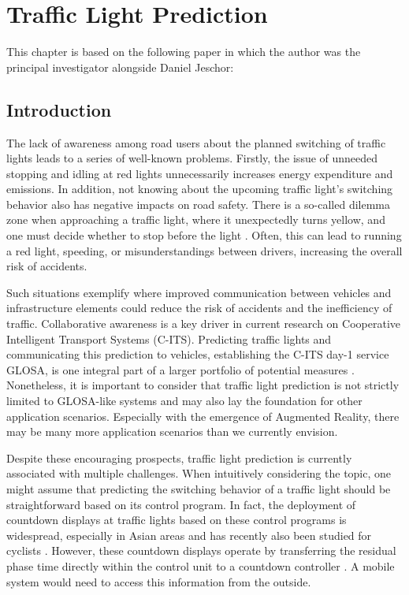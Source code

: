 \chapter{Traffic Light Prediction}\label{ch:prediction}

\begin{Summary}
This chapter is based on the following paper in which the author was the principal investigator alongside Daniel Jeschor:

\cite{jeschor2024cloudy} 
\end{Summary}

\section{Introduction}

The lack of awareness among road users about the planned switching of traffic lights leads to a series of well-known problems. Firstly, the issue of unneeded stopping and idling at red lights unnecessarily increases energy expenditure and emissions. In addition, not knowing about the upcoming traffic light's switching behavior also has negative impacts on road safety. There is a so-called dilemma zone when approaching a traffic light, where it unexpectedly turns yellow, and one must decide whether to stop before the light \cite{zhang_yellow_2014}. Often, this can lead to running a red light, speeding, or misunderstandings between drivers, increasing the overall risk of accidents.

Such situations exemplify where improved communication between vehicles and infrastructure elements could reduce the risk of accidents and the inefficiency of traffic. Collaborative awareness is a key driver in current research on Cooperative Intelligent Transport Systems (C-ITS). Predicting traffic lights and communicating this prediction to vehicles, establishing the C-ITS day-1 service GLOSA, is one integral part of a larger portfolio of potential measures \cite{mellegard_day_2020}. Nonetheless, it is important to consider that traffic light prediction is not strictly limited to GLOSA-like systems and may also lay the foundation for other application scenarios. Especially with the emergence of Augmented Reality, there may be many more application scenarios than we currently envision.

Despite these encouraging prospects, traffic light prediction is currently associated with multiple challenges. When intuitively considering the topic, one might assume that predicting the switching behavior of a traffic light should be straightforward based on its control program. In fact, the deployment of countdown displays at traffic lights based on these control programs is widespread, especially in Asian areas \cite{pan_impact_2023} and has recently also been studied for cyclists \cite{kaths_green_2019}. However, these countdown displays operate by transferring the residual phase time directly within the control unit to a countdown controller \cite{islam_improved_2016}. A mobile system would need to access this information from the outside.

